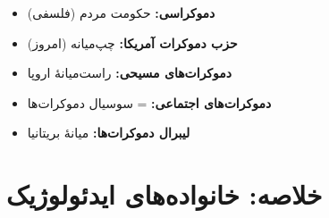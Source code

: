 \begin{tcolorbox}[
    enhanced,
    colback=goldaccent!10,
    colframe=goldaccent,
    boxrule=1.5pt,
    arc=5pt,
    fonttitle=\bfseries,
    title={\rl{🟡 دموکرات: گیجی‌های مشابه}}
]
\begin{itemize}
    \item \textbf{دموکراسی:} حکومت مردم (فلسفی)
    \item \textbf{حزب دموکرات آمریکا:} چپ‌میانه (امروز)
    \item \textbf{دموکرات‌های مسیحی:} راست‌میانهٔ اروپا
    \item \textbf{دموکرات‌های اجتماعی:} = سوسیال دموکرات‌ها
    \item \textbf{لیبرال دموکرات‌ها:} میانهٔ بریتانیا
\end{itemize}
\end{tcolorbox}

\section*{خلاصه: خانواده‌های ایدئولوژیک}

